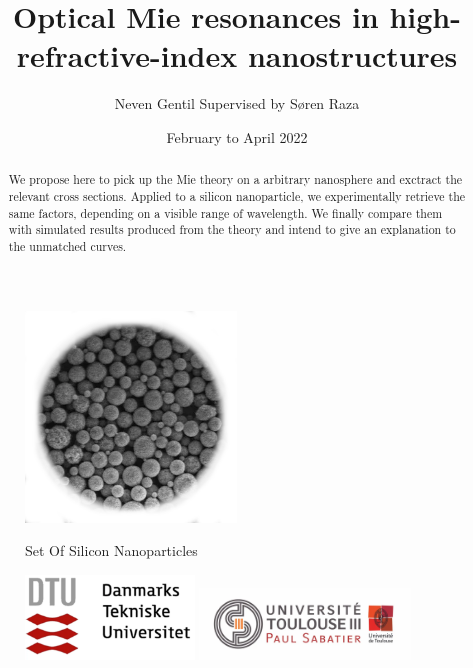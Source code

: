 \documentclass{article}
\title{Optical Mie resonances in high-refractive-index nanostructures}
\author{Neven Gentil Supervised by Søren Raza}
\date{February to April 2022}
\numberwithin{equation}{section}
\begin{document}
\begin{titlingpage}
\maketitle
\begin{figure}[h!]
    \centering
    \includegraphics[width=0.5\textwidth, height=0.5\textwidth]{silicon_nanoparticles.png}
    \label{fig:silicon_nanoparticles}

    Set Of Silicon Nanoparticles
\end{figure}
\begin{abstract}
We propose here to pick up the Mie theory on a arbitrary nanosphere and exctract the relevant cross sections. Applied to a silicon nanoparticle, we experimentally retrieve the same factors, depending on a visible range of wavelength. We finally compare them with simulated results produced from the theory and intend to give an explanation to the unmatched curves.
\end{abstract}
\begin{figure}[b]
    \begin{minipage}{0.48\textwidth}
        \includegraphics[width=0.4\textwidth, height=0.2\textwidth,left]{dtu_logo.png}
    \end{minipage}\hfill
    \begin{minipage}{0.48\textwidth}
        \includegraphics[width=0.5\textwidth, height=0.2\textwidth,right]{ut3_logo.png}
    \end{minipage}
\end{figure}
\end{titlingpage}
\end{document}

